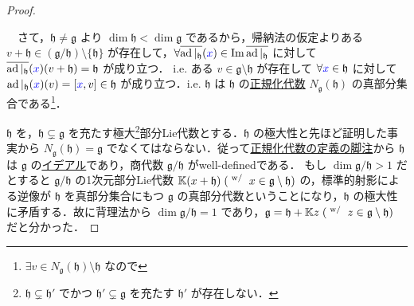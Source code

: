 \documentclass[rep_main]{subfiles}
\begin{document}
\begin{proof}
\begin{description}
            　さて，$\mathfrak{h} \neq \mathfrak{g}$ より $\dim \mathfrak{h} < \dim \mathfrak{g}$ であるから，帰納法の仮定よりある $v + \mathfrak{h} \in (\mathfrak{g} / \mathfrak{h}) \setminus \{\mathfrak{h}\}$ が存在して，$\forall \overline{\operatorname{ad}|_{\mathfrak{h}}} (\textcolor{blue}{x}) \in \Im \overline{\operatorname{ad}|_{\mathfrak{h}}}$ に対して $\overline{\operatorname{ad}|_{\mathfrak{h}}} (\textcolor{blue}{x}) (v + \mathfrak{h}) = \mathfrak{h}$ が成り立つ．
            i.e. ある $v \in \mathfrak{g} \setminus \mathfrak{h}$ が存在して $\forall \textcolor{blue}{x} \in \mathfrak{h}$ に対して $\ad|_{\mathfrak{h}} (\textcolor{blue}{x}) (v) = \comm{\textcolor{blue}{x}}{v} \in \mathfrak{h}$ が成り立つ．i.e. $\mathfrak{h}$ は $\mathfrak{h}$ の\hyperref[def:normalizer-LieAlg]{正規化代数} $N_{\mathfrak{g}} (\mathfrak{h})$ の真部分集合である\footnote{$\exists v \in N_{\mathfrak{g}}(\mathfrak{h}) \setminus \mathfrak{h}$ なので}．
    \end{description}

    $\mathfrak{h}$ を，$\mathfrak{h} \subsetneq \mathfrak{g}$ を充たす極大\footnote{$\mathfrak{h} \subsetneq \mathfrak{h}'$ でかつ $\mathfrak{h}' \subsetneq \mathfrak{g}$ を充たす $\mathfrak{h}'$ が存在しない．}部分Lie代数とする．$\mathfrak{h}$ の極大性と先ほど証明した事実から $N_{\mathfrak{g}} (\mathfrak{h}) = \mathfrak{g}$ でなくてはならない．従って\hyperref[def:normalizer-LieAlg]{正規化代数の定義の脚注}から $\mathfrak{h}$ は $\mathfrak{g}$ の\hyperref[def:ideal-LieAlg]{イデアル}であり，商代数 $\mathfrak{g} / \mathfrak{h}$ がwell-definedである．
    もし $\dim \mathfrak{g} / \mathfrak{h} > 1$ だとすると $\mathfrak{g} / \mathfrak{h}$ の1次元部分Lie代数 $\mathbb{K} (x + \mathfrak{h})\; (\mathrel{} {}^{\mathrm{w}/} \mathrel{} x \in \mathfrak{g} \setminus \mathfrak{h})$ の，標準的射影による逆像が $\mathfrak{h}$ を真部分集合にもつ $\mathfrak{g}$ の真部分代数ということになり，$\mathfrak{h}$ の極大性に矛盾する．故に背理法から $\dim \mathfrak{g} / \mathfrak{h} = 1$ であり，$\mathfrak{g} = \mathfrak{h} + \mathbb{K} z\; (\mathrel{} {}^{\mathrm{w}/} \mathrel{} z \in \mathfrak{g} \setminus \mathfrak{h})$ だと分かった．


\end{proof}
\end{document}
